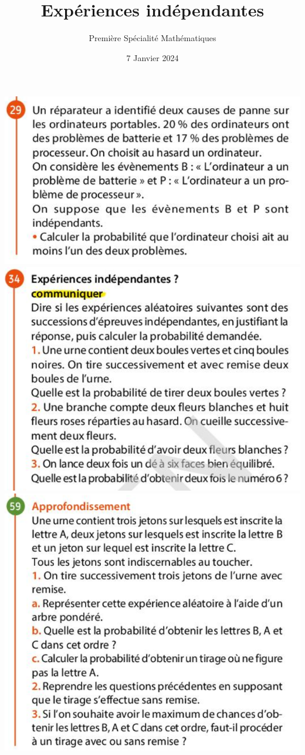 \documentclass{article}
\title{Expériences indépendantes}
\author{Première Spécialité Mathématiques}
\date{7 Janvier 2024}
\begin{document}
\begin{center}
\includegraphics[width=\textwidth]{Exercice_2.png}
\includegraphics[width=\textwidth]{Exercice_3.png}
\includegraphics[width=\textwidth]{Exercice_1.png}
\end{center}
\end{document}
